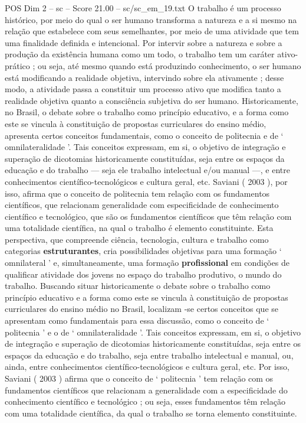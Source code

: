 \begin{textsample}{POS Dim 2 – sc – Score 21.00 – sc/sc\_em\_19.txt}
O trabalho é um processo histórico, por meio do qual o ser humano transforma a natureza e a si mesmo na relação que estabelece com seus semelhantes, por meio de uma atividade que tem uma finalidade definida e intencional.
Por intervir sobre a natureza e sobre a produção da existência humana como um todo, o trabalho tem um caráter ativo-prático ; ou seja, até mesmo quando está produzindo conhecimento, o ser humano está modificando a realidade objetiva, intervindo sobre ela ativamente ; desse modo, a atividade passa a constituir um processo ativo que modifica tanto a realidade objetiva quanto a consciência subjetiva do ser humano.
Historicamente, no Brasil, o debate sobre o trabalho como princípio educativo, e a forma como este se vincula à constituição de propostas curriculares do ensino médio, apresenta certos conceitos fundamentais, como o conceito de politecnia e de ‘ omnilateralidade ’.
Tais conceitos expressam, em si, o objetivo de integração e superação de dicotomias historicamente constituídas, seja entre os espaços da educação e do trabalho — seja ele trabalho intelectual e/ou manual —, e entre conhecimentos científico-tecnológicos e cultura geral, etc.
Saviani ( 2003 ), por isso, afirma que o conceito de politecnia tem relação com os fundamentos científicos, que relacionam generalidade com especificidade de conhecimento científico e tecnológico, que são os fundamentos científicos que têm relação com uma totalidade científica, na qual o trabalho é elemento constituinte.
Esta perspectiva, que compreende ciência, tecnologia, cultura e trabalho como categorias \textbf{estruturantes}, cria possibilidades objetivas para uma formação ‘ omnilateral ’ e, simultaneamente, uma formação \textbf{profissional} em condições de qualificar atividade dos jovens no espaço do trabalho produtivo, o mundo do trabalho.
Buscando situar historicamente o debate sobre o trabalho como princípio educativo e a forma como este se vincula à constituição de propostas curriculares do ensino médio no Brasil, localizam -se certos conceitos que se apresentam como fundamentais para essa discussão, como o conceito de ‘ politecnia ’ e o de ‘ omnilateralidade ’.
Tais conceitos expressam, em si, o objetivo de integração e superação de dicotomias historicamente constituídas, seja entre os espaços da educação e do trabalho, seja entre trabalho intelectual e manual, ou, ainda, entre conhecimentos científico-tecnológicos e cultura geral, etc.
Por isso, Saviani ( 2003 ) afirma que o conceito de ‘ politecnia ’ tem relação com os fundamentos científicos que relacionam a generalidade com a especificidade do conhecimento científico e tecnológico ; ou seja, esses fundamentos têm relação com uma totalidade científica, da qual o trabalho se torna elemento constituinte.

\end{textsample}
